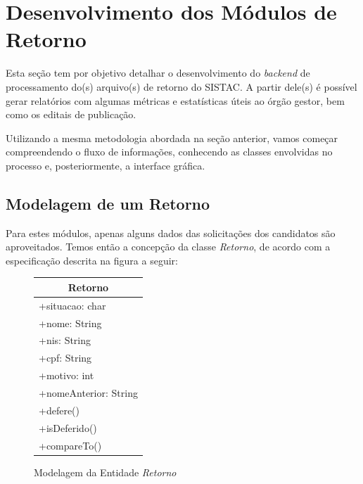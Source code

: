 \documentclass[
	12pt,			%
	openright,		%
	oneside,	
	a4paper,		%
	english,		%
	brazil			%
]{abntex2/abntex2}  %
\begin{document}
		\section{Desenvolvimento dos Módulos de Retorno}
	
			Esta seção tem por objetivo detalhar o desenvolvimento do \textit{backend} de processamento do(s) arquivo(s) de retorno do SISTAC. A partir dele(s) é possível gerar relatórios com algumas métricas e estatísticas úteis ao órgão gestor, bem como os editais de publicação.
	
			Utilizando a mesma metodologia abordada na seção anterior, vamos começar compreendendo o fluxo de informações, conhecendo as classes envolvidas no processo e, posteriormente, a interface gráfica.
	
			\subsection{Modelagem de um Retorno}
	
				Para estes módulos, apenas alguns dados das solicitações dos candidatos são aproveitados. Temos então a concepção da classe \textit{Retorno}, de acordo com a especificação descrita na figura a seguir:
	
				\begin{figure}[h]
					\begin{center}
						
						\caption{Modelagem da Entidade \textit{Retorno}}
						\label{retorno-uml}
							
						\begin{tabular}{|l|}
							\hline
							\multicolumn{1}{|c|}{\textbf{Retorno}} \\ \hline
							+situacao: char                        \\
							+nome: String                          \\
							+nis: String                           \\
							+cpf: String                           \\
							+motivo: int                           \\
							+nomeAnterior: String                  \\ \hline
							+defere()                              \\
							+isDeferido()                          \\
							+compareTo()                           \\ \hline
						\end{tabular}
						
					\end{center}
				\end{figure}
	
\end{document}
